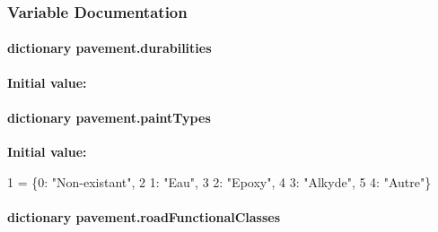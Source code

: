 \subsubsection{Variable Documentation}
\hypertarget{namespacepavement_ac47a6ee1509d65ecfb77d39489de0bf7}{
\paragraph[{durabilities}]{\setlength{\rightskip}{0pt plus 5cm}dictionary pavement.\-durabilities}}\label{namespacepavement_ac47a6ee1509d65ecfb77d39489de0bf7}
{\bfseries Initial value\-:}
\hypertarget{namespacepavement_a40fec2a77d81ff59109d289c0732b0b7}{
\paragraph[{paint\-Types}]{\setlength{\rightskip}{0pt plus 5cm}dictionary pavement.\-paint\-Types}}\label{namespacepavement_a40fec2a77d81ff59109d289c0732b0b7}
{\bfseries Initial value\-:}
\begin{DoxyCode}
1 = \{0: \textcolor{stringliteral}{"Non-existant"},
2               1: \textcolor{stringliteral}{"Eau"},
3               2: \textcolor{stringliteral}{"Epoxy"},
4               3: \textcolor{stringliteral}{"Alkyde"},
5               4: \textcolor{stringliteral}{"Autre"}\}
\end{DoxyCode}
\hypertarget{namespacepavement_ae58e78f8342ea7dd1a715bad1f40e142}{
\paragraph[{road\-Functional\-Classes}]{\setlength{\rightskip}{0pt plus 5cm}dictionary pavement.\-road\-Functional\-Classes}}\label{namespacepavement_ae58e78f8342ea7dd1a715bad1f40e142}

